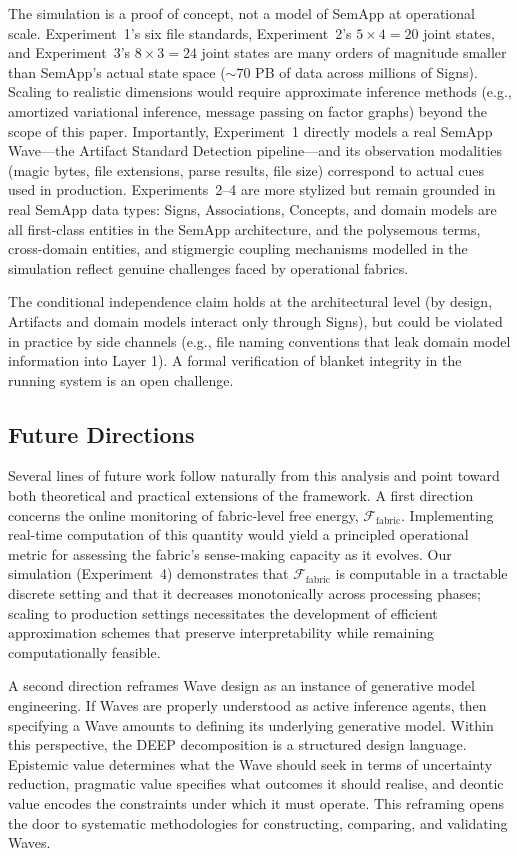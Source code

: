 \documentclass[11pt,a4paper]{article}
\theoremstyle{definition}
\begin{document}
The simulation is a proof of concept, not a model of SemApp at operational scale. Experiment~1's six file standards, Experiment~2's $5 \times 4 = 20$ joint states, and Experiment~3's $8 \times 3 = 24$ joint states are many orders of magnitude smaller than SemApp's actual state space ($\sim 70$ PB of data across millions of Signs). Scaling to realistic dimensions would require approximate inference methods (e.g., amortized variational inference, message passing on factor graphs) beyond the scope of this paper. Importantly, Experiment~1 directly models a real SemApp Wave---the Artifact Standard Detection pipeline---and its observation modalities (magic bytes, file extensions, parse results, file size) correspond to actual cues used in production. Experiments~2--4 are more stylized but remain grounded in real SemApp data types: Signs, Associations, Concepts, and domain models are all first-class entities in the SemApp architecture, and the polysemous terms, cross-domain entities, and stigmergic coupling mechanisms modelled in the simulation reflect genuine challenges faced by operational fabrics.

The conditional independence claim holds at the architectural level (by design, Artifacts and domain models interact only through Signs), but could be violated in practice by side channels (e.g., file naming conventions that leak domain model information into Layer 1). A formal verification of blanket integrity in the running system is an open challenge.

\subsection{Future Directions}

Several lines of future work follow naturally from this analysis and point toward both theoretical and practical extensions of the framework. A first direction concerns the online monitoring of fabric-level free energy, $\mathcal{F}_{\text{fabric}}$. Implementing real-time computation of this quantity would yield a principled operational metric for assessing the fabric's sense-making capacity as it evolves. Our simulation (Experiment~4) demonstrates that $\mathcal{F}_{\text{fabric}}$ is computable in a tractable discrete setting and that it decreases monotonically across processing phases; scaling to production settings necessitates the development of efficient approximation schemes that preserve interpretability while remaining computationally feasible.

A second direction reframes Wave design as an instance of generative model engineering. If Waves are properly understood as active inference agents, then specifying a Wave amounts to defining its underlying generative model. Within this perspective, the DEEP decomposition is a structured design language. Epistemic value determines what the Wave should seek in terms of uncertainty reduction, pragmatic value specifies what outcomes it should realise, and deontic value encodes the constraints under which it must operate. This reframing opens the door to systematic methodologies for constructing, comparing, and validating Waves.
\end{document}
